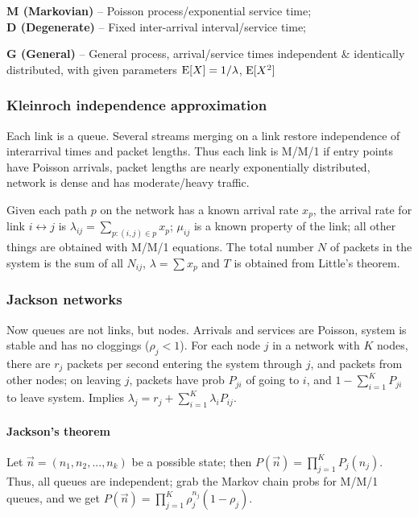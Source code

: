 \documentclass{form}
\begin{document}
\begin{minipage}{0.707\textwidth}
\begin{tabular}{@{}l || c | c | c | c | c @{}}
    \end{tabular}
    \begin{minipage}[t]{0.557\linewidth}
        \textbf{M (Markovian)} -- Poisson process/exponential service time; \\
        \textbf{D (Degenerate)} -- Fixed inter-arrival interval/service time;
    \end{minipage}
    \begin{minipage}[t]{0.433\linewidth}
        \textbf{G (General)} -- General process, arrival/service times independent \& identically distributed, with given parameters $\operatorname{E}[X]=1/\lambda$, $\operatorname{E}[X^2]$
    \end{minipage}%
\end{minipage}

\begin{multicols}{2}
    \subsubsection*{Kleinroch independence approximation}
    Each link is a queue. Several streams merging on a link restore independence of interarrival times and packet lengths. Thus each link is M/M/1 if entry points have Poisson arrivals, packet lengths are nearly exponentially distributed, network is dense and has moderate/heavy traffic.

    Given each path $p$ on the network has a known arrival rate $x_p$, the arrival rate for link $i \leftrightarrow j$ is $\lambda_{ij} = \sum_{p : (i,j) \in p}{x_p}$; $\mu_{ij}$ is a known property of the link; all other things are obtained with M/M/1 equations. The total number $N$ of packets in the system is the sum of all $N_{ij}$, $\lambda = \sum{x_p}$ and $T$ is obtained from Little's theorem.

    \subsubsection*{Jackson networks}
    Now queues are not links, but nodes. Arrivals and services are Poisson, system is stable and has no cloggings ($\rho_j < 1$). For each node $j$ in a network with $K$ nodes, there are $r_j$ packets per second entering the system through $j$, and packets from other nodes; on leaving $j$, packets have prob $P_{ji}$ of going to $i$, and $1-\sum_{i=1}^{K}{P_{ji}}$ to leave system. Implies $\lambda_j = r_j + \sum_{i=1}^{K}{\lambda_i P_{ij}}$.

    \paragraph{Jackson's theorem} Let $\vec{n} = (n_1, n_2, ..., n_k)$ be a possible state; then $P(\vec{n}) = \prod_{j=1}^{K}{P_j(n_j)}$. Thus, all queues are independent; grab the Markov chain probs for M/M/1 queues, and we get $P(\vec{n}) = \prod_{j=1}^{K}{\rho_j^{n_j}(1-\rho_j)}$.

\end{multicols}
\end{document}
